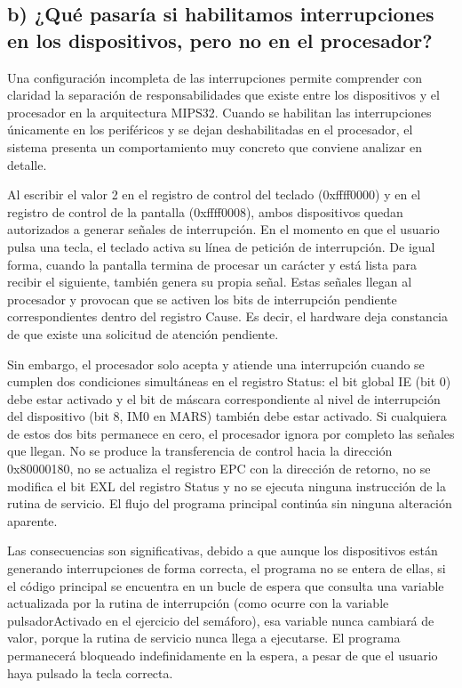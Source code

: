 \documentclass[12pt, letterpaper]{article}
\begin{document}
\subsection*{b) ¿Qué pasaría si habilitamos interrupciones en los dispositivos, pero no en el procesador?}
Una configuración incompleta de las interrupciones permite comprender con claridad la separación de responsabilidades que existe entre los dispositivos y el procesador en la arquitectura MIPS32. Cuando se habilitan las interrupciones únicamente en los periféricos y se dejan deshabilitadas en el procesador, el sistema presenta un comportamiento muy concreto que conviene analizar en detalle.

Al escribir el valor 2 en el registro de control del teclado (0xffff0000) y en el registro de control de la pantalla (0xffff0008), ambos dispositivos quedan autorizados a generar señales de interrupción. En el momento en que el usuario pulsa una tecla, el teclado activa su línea de petición de interrupción. De igual forma, cuando la pantalla termina de procesar un carácter y está lista para recibir el siguiente, también genera su propia señal. Estas señales llegan al procesador y provocan que se activen los bits de interrupción pendiente correspondientes dentro del registro Cause. Es decir, el hardware deja constancia de que existe una solicitud de atención pendiente.

Sin embargo, el procesador solo acepta y atiende una interrupción cuando se cumplen dos condiciones simultáneas en el registro Status: el bit global IE (bit 0) debe estar activado y el bit de máscara correspondiente al nivel de interrupción del dispositivo (bit 8, IM0 en MARS) también debe estar activado. Si cualquiera de estos dos bits permanece en cero, el procesador ignora por completo las señales que llegan. No se produce la transferencia de control hacia la dirección 0x80000180, no se actualiza el registro EPC con la dirección de retorno, no se modifica el bit EXL del registro Status y no se ejecuta ninguna instrucción de la rutina de servicio. El flujo del programa principal continúa sin ninguna alteración aparente.

Las consecuencias son significativas, debido a que aunque los dispositivos están generando interrupciones de forma correcta, el programa no se entera de ellas, si el código principal se encuentra en un bucle de espera que consulta una variable actualizada por la rutina de interrupción (como ocurre con la variable pulsadorActivado en el ejercicio del semáforo), esa variable nunca cambiará de valor, porque la rutina de servicio nunca llega a ejecutarse. El programa permanecerá bloqueado indefinidamente en la espera, a pesar de que el usuario haya pulsado la tecla correcta.
\end{document}
